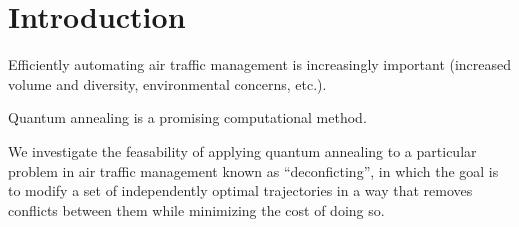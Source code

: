\section{Introduction}
Efficiently automating air traffic management is increasingly important (increased volume and diversity, environmental concerns, etc.).


Quantum annealing is a promising computational method.

We investigate the feasability of applying quantum annealing to a particular problem in air traffic management known as ``deconficting'', in which the goal is to modify a set of independently optimal trajectories in a way that removes conflicts between them while minimizing the cost of doing so.


